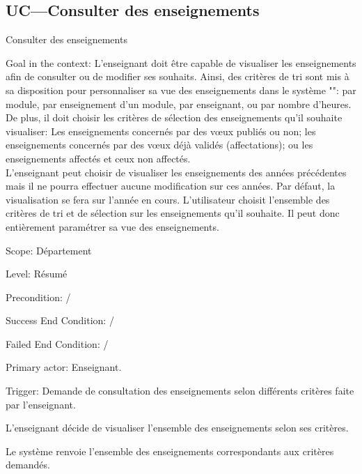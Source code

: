\begin{ocl}
 \subsection{UC---Consulter des enseignements}

\begin{usecase}{Consulter des enseignements}
\label{usecase:consulter}
\begin{information}
	\item[Goal in the context:]  L'enseignant doit être capable de visualiser les enseignements afin de consulter ou de modifier ses souhaits.
 Ainsi, des critères de tri sont mis à sa disposition pour personnaliser sa vue des enseignements dans le système "\projet": par module, par enseignement d'un module, par enseignant, ou par nombre d'heures.\\
 De plus, il doit choisir les critères de sélection des enseignements qu'il souhaite visualiser:
Les enseignements concernés par des v\oe ux publiés ou non; les enseignements concernés par des v\oe ux déjà validés (affectations);
ou les enseignements affectés et ceux non affectés.\\
 L'enseignant peut choisir de visualiser les enseignements des années précédentes mais il ne pourra effectuer aucune modification sur ces années. Par défaut, la visualisation se fera sur l'année en cours.
 L'utilisateur choisit l'ensemble des critères de tri et de sélection sur les enseignements qu'il souhaite. Il peut donc entièrement paramétrer sa vue des enseignements.
	\item[Scope:] Département
	\item[Level:] Résumé
	\item[Precondition:]/
	\item[Success End Condition:]/
	\item[Failed End Condition:]/
	\item[Primary actor:] Enseignant.
	\item[Trigger:] Demande de consultation des enseignements selon différents critères faite par l'enseignant.
\end{information}

\begin{scenario}
	\item L'enseignant décide de visualiser l'ensemble des enseignements selon ses critères.
	\item Le système renvoie l'ensemble des enseignements correspondants aux critères demandés.
\end{scenario}


\end{usecase}
\end{ocl}
